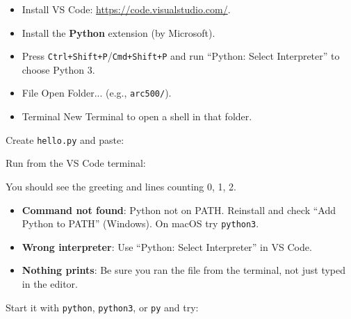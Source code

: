 
\begin{itemize}
  \item Install VS Code: \url{https://code.visualstudio.com/}.
  \item Install the \textbf{Python} extension (by Microsoft).
  \item Press \texttt{Ctrl+Shift+P}/\texttt{Cmd+Shift+P} and run ``Python: Select Interpreter'' to choose Python 3.
\end{itemize}

\begin{itemize}
  \item File \textrightarrow{} Open Folder... (e.g., \texttt{arc500/}).
  \item Terminal \textrightarrow{} New Terminal to open a shell in that folder.
\end{itemize}

Create \texttt{hello.py} and paste:


Run from the VS Code terminal:


You should see the greeting and lines counting 0, 1, 2.

\begin{itemize}
  \item \textbf{Command not found}: Python not on PATH. Reinstall and check ``Add Python to PATH'' (Windows). On macOS try \texttt{python3}.
  \item \textbf{Wrong interpreter}: Use ``Python: Select Interpreter'' in VS Code.
  \item \textbf{Nothing prints}: Be sure you ran the file from the terminal, not just typed in the editor.
\end{itemize}

Start it with \texttt{python}, \texttt{python3}, or \texttt{py} and try:

